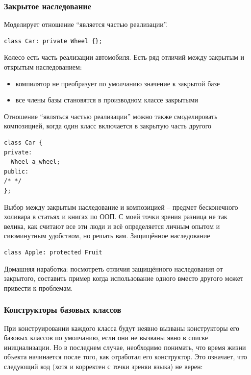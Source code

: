 \documentclass[a4paper,12pt,oneside]{article}
\begin{document}
\subsubsection{Закрытое наследование}

Моделирует отношение ``является частью реализации''.

\begin{lstlisting}
class Car: private Wheel {};
\end{lstlisting}

Колесо есть часть реализации автомобиля. Есть ряд отличий между закрытым и открытым наследованием: 

\begin{itemize}
\item
компилятор не преобразует по умолчанию значение к закрытой базе
\item
все члены базы становятся в производном классе закрытыми
\end{itemize}

Отношение ``являться частью реализации'' можно также смоделировать композицией, когда один класс включается в закрытую часть другого

\begin{lstlisting}
class Car {
private:
  Wheel a_wheel;
public:
/* */
};
\end{lstlisting}

Выбор между закрытым наследование и композицией – предмет бесконечного холивара в статьях и книгах по ООП. С моей точки зрения разница не так велика, как считают все эти люди и всё определяется личным опытом и сиюминутным удобством, но решать вам.
Защищённое наследование 

\begin{lstlisting}
class Apple: protected Fruit
\end{lstlisting}

Домашняя наработка: посмотреть отличия защищённого наследования от закрытого, составить пример когда использование одного вместо другого может привести к проблемам.

\subsubsection{Конструкторы базовых классов}

При конструировании каждого класса будут неявно вызваны конструкторы его базовых классов по умолчанию, если они не вызваны явно в списке инициализации. Но в последнем случае, необходимо понимать, что время жизни объекта начинается после того, как отработал его конструктор. Это означает, что следующий код (хотя и корректен с точки зреняи языка) не верен:
\end{document}
